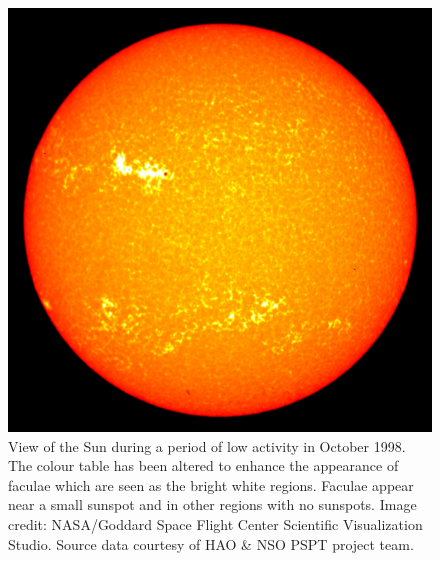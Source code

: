 \begin{figure}
    \centering
    \includegraphics[scale=0.15]{Figures/1-Introduction/faculae_example.jpg}
    \caption[Example of faculae during a period of low activity on the Sun]{View of the Sun during a period of low activity in October 1998. The colour table has been altered to enhance the appearance of faculae which are seen as the bright white regions. Faculae appear near a small sunspot and in other regions with no sunspots. Image credit: NASA/Goddard Space Flight Center Scientific Visualization Studio. Source data courtesy of HAO \& NSO PSPT project team.}
    \label{fig:faculae_example}
\end{figure}

